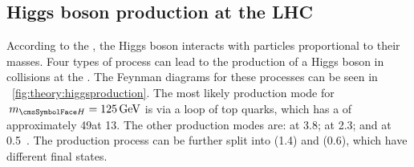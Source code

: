 \subsection{Higgs boson production at the LHC}
\label{sec:th:higgs_production_modes}

According to the \SM, the Higgs boson interacts with particles proportional to their masses. Four types of process can lead to the production of a Higgs boson in \pp collisions at the \LHC. The Feynman diagrams for these processes can be seen in \Fig~\ref{fig:theory:higgsproduction}. The most likely production mode for $\mH=125\GeV$ is \ggH via a loop of top quarks, which has a \crosssection of approximately 49\pb at 13\TeV. The other production modes are: \VBF at 3.8\pb; \VH at 2.3\pb; and \ttH at 0.5\pb~\cite{LHCHXSWGYR4}. The \VH production process can be further split into \WH (1.4\pb) and \ZH (0.6\pb), which have different final states.

